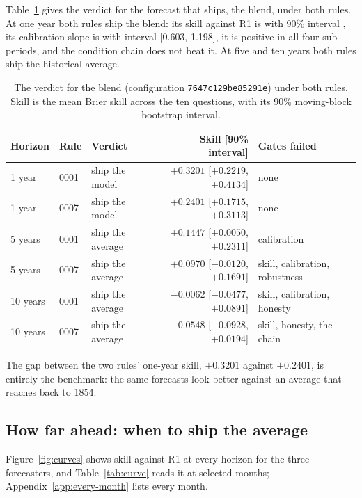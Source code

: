 \documentclass[11pt]{article}
\begin{document}
Table~\ref{tab:verdict} gives the verdict for the forecast that ships, the blend, under both rules. At
one year both rules ship the blend: its skill against R1 is \BlendSkillOneYear{} with 90\% interval
\BlendIntervalOneYear, its calibration slope is \BlendSlopeOneYear{} with interval [0.603, 1.198], it is
positive in all four sub-periods, and the condition chain does not beat it. At five and ten years both
rules ship the historical average.

\begin{table}[t]
\centering
\caption{The verdict for the blend (configuration \texttt{7647c129be85291e}) under both rules. Skill is
the mean Brier skill across the ten questions, with its 90\% moving-block bootstrap interval.}
\label{tab:verdict}
\small
\begin{tabular}{lllrl}
\toprule
Horizon & Rule & Verdict & Skill [90\% interval] & Gates failed \\
\midrule
1 year & 0001 & ship the model & $+0.3201$ [$+0.2219$, $+0.4134$] & none \\
1 year & 0007 & ship the model & $+0.2401$ [$+0.1715$, $+0.3113$] & none \\
5 years & 0001 & ship the average & $+0.1447$ [$+0.0050$, $+0.2311$] & calibration \\
5 years & 0007 & ship the average & $+0.0970$ [$-0.0120$, $+0.1691$] & skill, calibration, robustness \\
10 years & 0001 & ship the average & $-0.0062$ [$-0.0477$, $+0.0891$] & skill, calibration, honesty \\
10 years & 0007 & ship the average & $-0.0548$ [$-0.0928$, $+0.0194$] & skill, honesty, the chain \\
\bottomrule
\end{tabular}
\end{table}

The gap between the two rules' one-year skill, $+0.3201$ against $+0.2401$, is entirely the benchmark:
the same forecasts look better against an average that reaches back to 1854.

\subsection{How far ahead: when to ship the average}\label{sec:horizon}

Figure~\ref{fig:curves} shows skill against R1 at every horizon for the three forecasters, and
Table~\ref{tab:curve} reads it at selected months; Appendix~\ref{app:every-month} lists every month.
\end{document}
